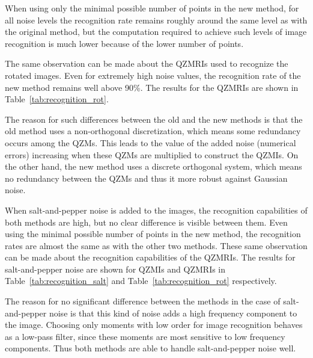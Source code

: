 When using only the minimal possible number of points in the new method, for all noise levels the recognition rate remains roughly around the same level as with the original method, but the computation required to achieve such levels of image recognition is much lower because of the lower number of points.

The same observation can be made about the QZMRIs used to recognize the rotated images. Even for extremely high noise values, the recognition rate of the new method remains well above 90\%. The results for the QZMRIs are shown in Table~\ref{tab:recognition_rot}.

The reason for such differences between the old and the new methods is that the old method uses a non-orthogonal discretization, which means some redundancy occurs among the QZMs. This leads to the value of the added noise (numerical errors) increasing when these QZMs are multiplied to construct the QZMIs. On the other hand, the new method uses a discrete orthogonal system, which means no redundancy between the QZMs and thus it more robust against Gaussian noise.

When salt-and-pepper noise is added to the images, the recognition capabilities of both methods are high, but no clear difference is visible between them. Even using the minimal possible number of points in the new method, the recognition rates are almost the same as with the other two methods. 
These same observation can be made about the recognition capabilities of the QZMRIs.
The results for salt-and-pepper noise are shown for QZMIs and QZMRIs in Table~\ref{tab:recognition_salt} and Table~\ref{tab:recognition_rot} respectively.

The reason for no significant difference between the methods in the case of salt-and-pepper noise is that this kind of noise adds a high frequency component to the image. Choosing only moments with low order for image recognition behaves as a low-pass filter, since these moments are most sensitive to low frequency components. Thus both methods are able to handle salt-and-pepper noise well.

